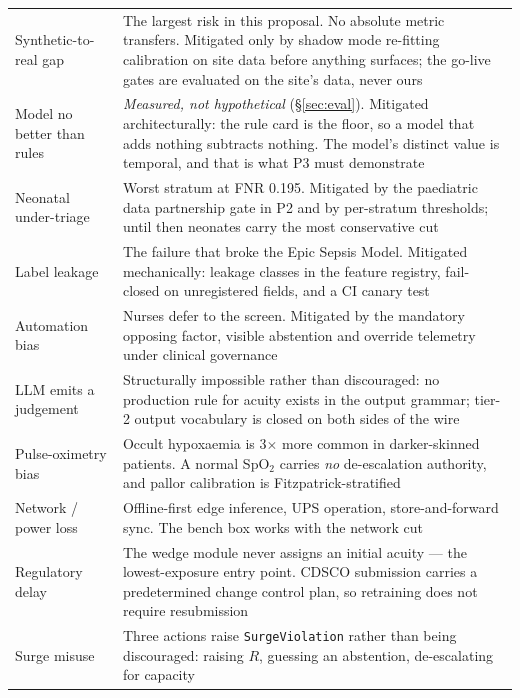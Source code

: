 \documentclass[10pt,a4paper,twocolumn]{article}
\newcommand{\cm}[1]{\texttt{#1}}
\begin{document}
{\footnotesize\sffamily
{}
\tabletail{}
\tablelasttail{\bottomrule}
\begin{supertabular}{@{}p{1.95cm}p{5.85cm}@{}}
Synthetic-to-real gap &
The largest risk in this proposal. No absolute metric transfers. Mitigated only by shadow mode
re-fitting calibration on site data before anything surfaces; the go-live gates are evaluated on
the site's data, never ours\\
\addlinespace[2pt]
Model no better than rules &
\emph{Measured, not hypothetical} (\S\ref{sec:eval}). Mitigated architecturally: the rule card is
the floor, so a model that adds nothing subtracts nothing. The model's distinct value is temporal,
and that is what P3 must demonstrate\\
\addlinespace[2pt]
Neonatal under-triage &
Worst stratum at FNR 0.195. Mitigated by the paediatric data partnership gate in P2 and by
per-stratum thresholds; until then neonates carry the most conservative cut\\
\addlinespace[2pt]
Label leakage &
The failure that broke the Epic Sepsis Model. Mitigated mechanically: leakage classes in the
feature registry, fail-closed on unregistered fields, and a CI canary test\\
\addlinespace[2pt]
Automation bias &
Nurses defer to the screen. Mitigated by the mandatory opposing factor, visible abstention and
override telemetry under clinical governance\\
\addlinespace[2pt]
LLM emits a judgement &
Structurally impossible rather than discouraged: no production rule for acuity exists in the output
grammar; tier-2 output vocabulary is closed on both sides of the wire\\
\addlinespace[2pt]
Pulse-oximetry bias &
Occult hypoxaemia is 3$\times$ more common in darker-skinned patients. A normal SpO$_2$ carries
\emph{no} de-escalation authority, and pallor calibration is Fitzpatrick-stratified\\
\addlinespace[2pt]
Network / power loss &
Offline-first edge inference, UPS operation, store-and-forward sync. The bench box works with the
network cut\\
\addlinespace[2pt]
Regulatory delay &
The wedge module never assigns an initial acuity --- the lowest-exposure entry point. CDSCO
submission carries a predetermined change control plan, so retraining does not require
resubmission\\
\addlinespace[2pt]
Surge misuse &
Three actions raise \cm{SurgeViolation} rather than being discouraged: raising $R$, guessing an
abstention, de-escalating for capacity\\
\end{supertabular}\par}
\end{document}
